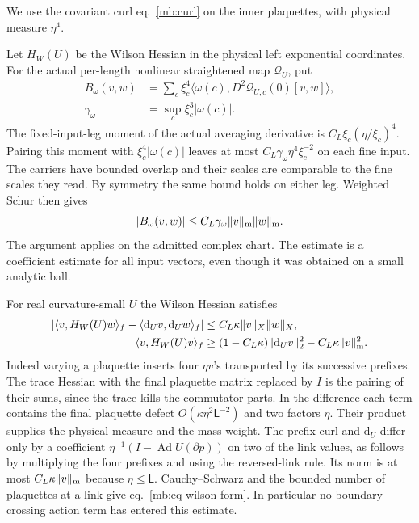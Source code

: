\documentclass[11pt,letterpaper,reqno]{amsart}
\numberwithin{equation}{section}
\renewcommand{\eqref}[1]{\textup{eq.~\ref{#1}}}
\theoremstyle{definition}
\theoremstyle{remark}
\begin{document}
We use the covariant curl \eqref{mb:curl} on the inner plaquettes,
with physical measure \(\eta^4\).

Let \(H_W(U)\) be the Wilson Hessian in the physical left
exponential coordinates. For the actual per-length nonlinear
straightened map \(\mathcal Q_U\), put
\begin{equation}\label{mb:eq-constraint-form}
 \begin{split}
 B_\omega(v,w)&=\sum_c\xi_c^4
    \langle\omega(c),D^2\mathcal Q_{U,c}(0)[v,w]\rangle,\\
 \gamma_\omega&=\sup_c\xi_c^3|\omega(c)|.
 \end{split}
\end{equation}
The fixed-input-leg moment of the actual averaging derivative
is \(C_L\xi_c(\eta/\xi_c)^4\). Pairing this moment with
\(\xi_c^4|\omega(c)|\) leaves at most
\(C_L\gamma_\omega\eta^4\xi_c^{-2}\) on each fine input.
The carriers have bounded overlap and their scales are
comparable to the fine scales they read. By symmetry the same
bound holds on either leg. Weighted Schur then gives
\begin{equation}\label{mb:eq-constraint-small}
             |B_\omega(v,w)|\le C_L\gamma_\omega
                                         \|v\|_{\rm m}\|w\|_{\rm m}.
\end{equation}
The argument applies on the admitted complex chart. The
estimate is a coefficient estimate for all input vectors,
even though it was obtained on a small analytic ball.

For real curvature-small \(U\) the Wilson Hessian satisfies
\begin{equation}\label{mb:eq-wilson-form}
 \begin{aligned}
 |\langle v,H_W(U)w\rangle_f-\langle\mathrm d_Uv,\mathrm d_Uw\rangle_f|
                                    &\le C_L\kappa\|v\|_X\|w\|_X,\\
 \langle v,H_W(U)v\rangle_f&\ge
    (1-C_L\kappa)\|\mathrm d_Uv\|_2^2-C_L\kappa\|v\|_{\rm m}^2 .
 \end{aligned}
\end{equation}
Indeed varying a plaquette inserts four \(\eta v\)'s transported
by its successive prefixes. The trace Hessian with the final
plaquette matrix replaced by \(I\) is the pairing of their
sums, since the trace kills the commutator parts. In the
difference each term contains the final plaquette defect
\(O(\kappa\eta^2\mathsf L^{-2})\) and two factors \(\eta\).
Their product supplies the physical measure and the mass weight.
The prefix curl and \(\mathrm d_U\) differ only by a coefficient
\(\eta^{-1}(I-\operatorname{Ad}U(\partial p))\) on two
of the link values, as follows by multiplying the four prefixes
and using the reversed-link rule. Its norm is at most
\(C_L\kappa\|v\|_{\rm m}\) because \(\eta\le\mathsf L\).
Cauchy--Schwarz and the bounded number of plaquettes at a
link give \eqref{mb:eq-wilson-form}. In particular no
boundary-crossing action term has entered this estimate.
\end{document}
